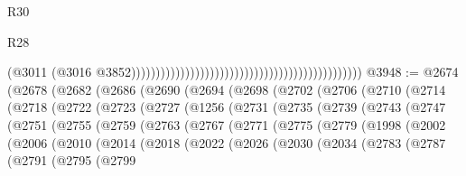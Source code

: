 \begin{lexlean}{R30}
\begin{lexlean}{R28}
\begin{coremodule}
{{{{{{{{{{{{{{{{{{{{{{{{{{{{{{{{{{{{{{{{{{{{{{{{{{{{{{{{{{{{{{{{{{{{{{{{{{{{{{{{{{{{{{{{{{{{{{{{{{{{{{{{{{{{{{{{{{{{{{{{{{{{{{{{{{{{{{{{{{{{{{{                                                                                              (@3011
                                                                                                (@3016
                                                                                                  @3852)))))))))))))))))))))))))))))))))))))))))))))))
@3948 := @2674
    (@2678
      (@2682
        (@2686
          (@2690
            (@2694
              (@2698
                (@2702
                  (@2706
                    (@2710
                      (@2714
                        (@2718
                          (@2722
                            (@2723
                              (@2727
                                (@1256
                                  (@2731
                                    (@2735
                                      (@2739
                                        (@2743
                                          (@2747
                                            (@2751
                                              (@2755
                                                (@2759
                                                  (@2763
                                                    (@2767
                                                      (@2771
                                                        (@2775
                                                          (@2779
                                                            (@1998
                                                              (@2002
                                                                (@2006
                                                                  (@2010
                                                                    (@2014
                                                                      (@2018
                                                                        (@2022
                                                                          (@2026
                                                                            (@2030
                                                                              (@2034
                                                                                (@2783
                                                                                  (@2787
                                                                                    (@2791
                                                                                      (@2795
                                                                                        (@2799
}}}}}}}}}}}}}}}}}}}}}}}}}}}}}}}}}}}}}}}}}}}}}}}}}}}}}}}}}}}}}}}}}}}}}}}}}}}}}}}}}}}}}}}}}}}}}}}}}}}}}}}}}}}}}}}}}}}}}}}}}}}}}}}}}}}}}}}}}}}}}}}
\end{coremodule}
\end{lexlean}
\end{lexlean}
